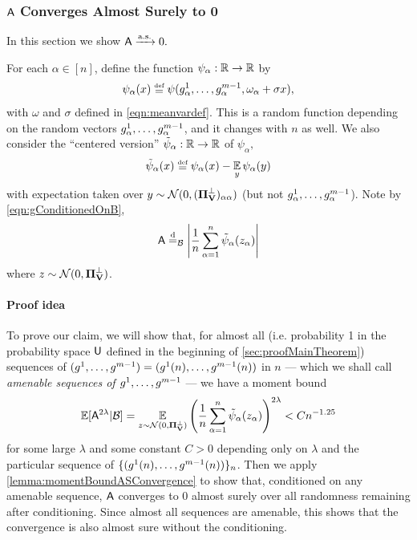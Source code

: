 \documentclass[main.tex]{subfiles}
\begin{document}
 
\subsubsection{\texorpdfstring{$\mathsf{A}$}{A} Converges Almost Surely to 0}
\label{sec:probA}

\newcommand{\rvec}{z}

In this section we show $\mathsf{A} \xrightarrow{\mathrm{a.s.}} 0.$

For each $\alpha \in [n]$, define the function $\psi_\alpha: \mathbb{R} \to \mathbb{R}$ by
 \[\psi_\alpha (x) \defeq \psi(g^1_\alpha, \ldots, g^{\MM-1}_\alpha, \omega_\alpha + \sigma x),\]
with $\omega$ and $\sigma$ defined in \cref{eqn:meanvardef}.
This is a random function depending on the random vectors $g^1_\alpha, \ldots, g^{m-1}_\alpha$, and it changes with $n$ as well.
We also consider the ``centered version'' $\tilde \psi_\alpha: \mathbb{R} \to \mathbb{R}$ of $\psi_\alpha,$
\[\tilde \psi_\alpha(x) \defeq \psi_\alpha(x) - \EV_{y}\psi_\alpha(y)\]
with expectation taken over $y \sim \mathcal{N}(0, (\boldsymbol{\Pi}^\perp_{\mathbf{V}})_{\alpha\alpha})$ (but not $g^1_\alpha, \ldots, g^{m-1}_\alpha$).
Note by \cref{eqn:gConditionedOnB},
\[ \probA \disteq_\Bb \left|\f 1 n \sum_{\alpha =1}^n \tilde \psi_\alpha(\rvec_\alpha)\right|\]
where $\rvec \sim \Gaus(0, \PP_{\Vme}^\perp)$.

\paragraph{Proof idea}
To prove our claim, we will show that, for almost all (i.e. probability 1 in the probability space $\mathsf{U}$ defined in the beginning of \cref{sec:proofMainTheorem}) sequences of $(g^1, \ldots, g^{m-1}) = (g^1(n), \ldots, g^{m-1}(n))$ in $n$ --- which we shall call \emph{amenable sequences of $g^1, \ldots, g^{m-1}$} --- 
we have a moment bound
\begin{equation}
\EV[\probA^{2\lambda} | \Bb] = 
\EV_{\rvec \sim \Gaus(0, \PP^\perp_{\Vme})} 
    \lp \f 1 n \sum_{\alpha =1}^n \tilde \psi_\alpha(\rvec_\alpha)\rp^{2\lambda}
    < C n^{-1.25}
    \label{eqn:highMomentBound}
\end{equation}
for some large $\lambda$ and some constant $C > 0$ depending only on $\lambda$ and the particular sequence of $\{(g^1(n), \ldots, g^{m-1}(n))\}_n$.
Then we apply \cref{lemma:momentBoundASConvergence} to show that, conditioned on any amenable sequence, $\mathsf{A}$ converges to 0 almost surely over all randomness remaining after conditioning.
Since almost all sequences are amenable, this shows that the convergence is also almost sure without the conditioning.
\end{document}
